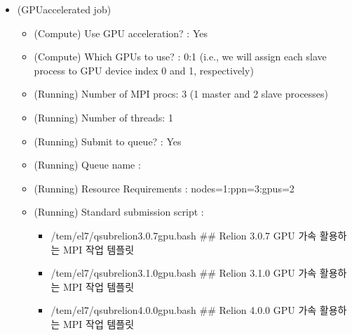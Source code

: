 \documentclass[a4paper,10pt,english]{sphinxmanual}
\begin{document}

\begin{itemize}
\item {} 
\sphinxAtStartPar
{} (GPU\sphinxhyphen{}accelerated job)
\begin{itemize}
\item {} 
\sphinxAtStartPar
(Compute) Use GPU acceleration? : Yes

\item {} 
\sphinxAtStartPar
(Compute) Which GPUs to use? : 0:1 (i.e., we will assign each slave process to GPU device index 0 and 1, respectively)

\item {} 
\sphinxAtStartPar
(Running) Number of MPI procs: 3 (1 master and 2 slave processes)

\item {} 
\sphinxAtStartPar
(Running) Number of threads: 1

\item {} 
\sphinxAtStartPar
(Running) Submit to queue? : Yes

\item {} 
\sphinxAtStartPar
(Running) Queue name : 

\item {} 
\sphinxAtStartPar
(Running) Resource Requirements : nodes=1:ppn=3:gpus=2

\item {} 
\sphinxAtStartPar
(Running) Standard submission script :
\begin{itemize}
\item {} 
\sphinxAtStartPar
/tem/el7/qsub\sphinxhyphen{}relion\sphinxhyphen{}3.0.7\sphinxhyphen{}gpu.bash           \#\# Relion 3.0.7 GPU 가속 활용하는 MPI 작업 템플릿

\item {} 
\sphinxAtStartPar
/tem/el7/qsub\sphinxhyphen{}relion\sphinxhyphen{}3.1.0\sphinxhyphen{}gpu.bash           \#\# Relion 3.1.0 GPU 가속 활용하는 MPI 작업 템플릿

\item {} 
\sphinxAtStartPar
/tem/el7/qsub\sphinxhyphen{}relion\sphinxhyphen{}4.0.0\sphinxhyphen{}gpu.bash           \#\# Relion 4.0.0 GPU 가속 활용하는 MPI 작업 템플릿

\end{itemize}

\end{itemize}

\end{itemize}
\end{document}
